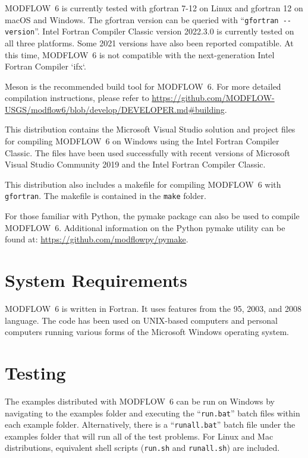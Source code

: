 \documentclass[11pt,twoside,twocolumn]{usgsreport}
\begin{document}
MODFLOW~6 is currently tested with gfortran 7-12 on Linux and gfortran 12 on macOS and Windows. The gfortran version can be queried with ``\verb|gfortran --version|''.  Intel Fortran Compiler Classic version 2022.3.0 is currently tested on all three platforms. Some 2021 versions have also been reported compatible. At this time, MODFLOW~6 is not compatible with the next-generation Intel Fortran Compiler `ifx`.

Meson is the recommended build tool for MODFLOW~6.  For more detailed compilation instructions, please refer to \url{https://github.com/MODFLOW-USGS/modflow6/blob/develop/DEVELOPER.md#building}.

This distribution contains the Microsoft Visual Studio solution and project files for compiling MODFLOW~6 on Windows using the Intel Fortran Compiler Classic.  The files have been used successfully with recent versions of Microsoft Visual Studio Community 2019 and the Intel Fortran Compiler Classic.

This distribution also includes a makefile for compiling MODFLOW~6 with \texttt{gfortran}.  The makefile is contained in the \texttt{make} folder.

For those familiar with Python, the pymake package can also be used to compile MODFLOW~6.  Additional information on the Python pymake utility can be found at: \url{https://github.com/modflowpy/pymake}.

\section{System Requirements}
MODFLOW~6 is written in Fortran.  It uses features from the 95, 2003, and 2008 language.  The code has been used on UNIX-based computers and personal computers running various forms of the Microsoft Windows operating system.

\section{Testing}
The examples distributed with MODFLOW~6 can be run on Windows by navigating to the examples folder and executing the ``\texttt{run.bat}'' batch files within each example folder.  Alternatively, there is a ``\texttt{runall.bat}'' batch file under the examples folder that will run all of the test problems.  For Linux and Mac distributions, equivalent shell scripts (\texttt{run.sh} and \texttt{runall.sh}) are included.
\end{document}
